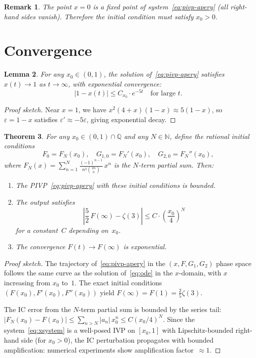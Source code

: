 \documentclass[11pt]{article}
\newtheorem{theorem}{Theorem}
\newtheorem{lemma}[theorem]{Lemma}
\newtheorem{remark}[theorem]{Remark}
\newcommand{\Q}{\mathbb{Q}}
\newcommand{\N}{\mathbb{N}}
\begin{document}
\begin{remark}
The point $x = 0$ is a \emph{fixed point} of system~\eqref{eq:pivp-apery}
(all right-hand sides vanish). Therefore the initial condition must satisfy $x_0 > 0$.
\end{remark}

\section{Convergence}

\begin{lemma}\label{lem:convergence}
For any $x_0 \in (0,1)$, the solution of~\eqref{eq:pivp-apery}
satisfies $x(t) \to 1$ as $t \to \infty$, with exponential convergence:
\[
  |1 - x(t)| \le C_{x_0} \cdot e^{-5t} \quad\text{for large } t.
\]
\end{lemma}

\begin{proof}[Proof sketch]
Near $x=1$, we have $x^2(4+x)(1-x) \approx 5(1-x)$,
so $\varepsilon = 1-x$ satisfies $\varepsilon' \approx -5\varepsilon$,
giving exponential decay.
\end{proof}

\begin{theorem}\label{thm:main}
For any $x_0 \in (0,1) \cap \Q$ and any $N \in \N$,
define the rational initial conditions
\begin{equation}\label{eq:ics}
  F_0 = F_N(x_0), \quad G_{1,0} = F_N'(x_0), \quad G_{2,0} = F_N''(x_0),
\end{equation}
where $F_N(x) = \sum_{n=1}^{N} \frac{(-1)^{n-1}}{n^3\binom{2n}{n}}\,x^n$
is the $N$-term partial sum.
Then:
\begin{enumerate}
\item The PIVP~\eqref{eq:pivp-apery} with these initial conditions is bounded.
\item The output satisfies
\[
  \left|\frac{5}{2}\,F(\infty) - \zeta(3)\right| \le C \cdot \left(\frac{x_0}{4}\right)^{\!N}
\]
for a constant~$C$ depending on~$x_0$.
\item The convergence $F(t) \to F(\infty)$ is exponential.
\end{enumerate}
\end{theorem}

\begin{proof}[Proof sketch]
The trajectory of~\eqref{eq:pivp-apery} in the $(x, F, G_1, G_2)$ phase space
follows the same curve as the solution of~\eqref{eq:ode} in the $x$-domain,
with $x$ increasing from $x_0$ to~$1$.
The exact initial conditions $(F(x_0), F'(x_0), F''(x_0))$ yield $F(\infty) = F(1) = \frac{2}{5}\zeta(3)$.

The IC error from the $N$-term partial sum is bounded by the series tail:
$|F_N(x_0) - F(x_0)| \le \sum_{n>N} |a_n|\,x_0^n \le C(x_0/4)^N$.
Since the system~\eqref{eq:xsystem} is a well-posed IVP on $[x_0, 1]$
with Lipschitz-bounded right-hand side (for $x_0 > 0$),
the IC perturbation propagates with bounded amplification:
numerical experiments show amplification factor~$\approx 1$.
\end{proof}
\end{document}
